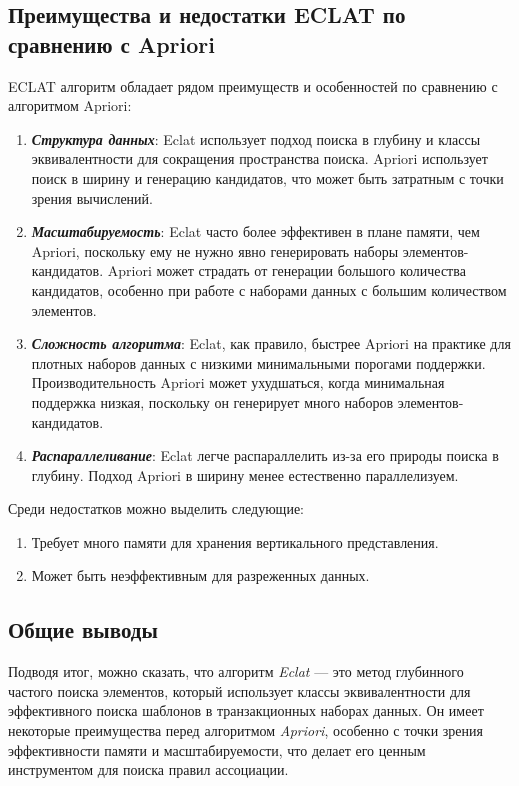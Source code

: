 \subsection{\textbf{Преимущества и недостатки ECLAT по сравнению с Apriori}}
ECLAT алгоритм обладает рядом преимуществ и особенностей по сравнению с алгоритмом Apriori:
\begin{enumerate}
    \item {\textbf{\textit{Структура данных}}:\newline
          Eclat использует подход поиска в глубину и классы эквивалентности для сокращения пространства поиска.\newline
          Apriori использует поиск в ширину и генерацию кандидатов, что может быть затратным с точки зрения вычислений.}
    \item {\textbf{\textit{Масштабируемость}}:\newline
          Eclat часто более эффективен в плане памяти, чем Apriori, поскольку ему не нужно явно генерировать наборы элементов-кандидатов. Apriori может страдать от генерации большого количества кандидатов, особенно при работе с наборами данных с большим количеством элементов.}
    \item {\textbf{\textit{Сложность алгоритма}}:\newline
          Eclat, как правило, быстрее Apriori на практике для плотных наборов данных с низкими минимальными порогами поддержки. Производительность Apriori может ухудшаться, когда минимальная поддержка низкая, поскольку он генерирует много наборов элементов-кандидатов.}
    \item {\textbf{\textit{Распараллеливание}}:\newline
          Eclat легче распараллелить из-за его природы поиска в глубину. Подход Apriori в ширину менее естественно параллелизуем.}
\end{enumerate}
Среди недостатков можно выделить следующие:
\begin{enumerate}
    \item {Требует много памяти для хранения вертикального представления.}
    \item {Может быть неэффективным для разреженных данных.}
\end{enumerate}
\subsection{Общие выводы}
Подводя итог, можно сказать, что алгоритм \textit{Eclat} — это метод глубинного частого поиска элементов, который использует классы эквивалентности для эффективного поиска шаблонов в транзакционных наборах данных. Он имеет некоторые преимущества перед алгоритмом \textit{Apriori}, особенно с точки зрения эффективности памяти и масштабируемости, что делает его ценным инструментом для поиска правил ассоциации.


